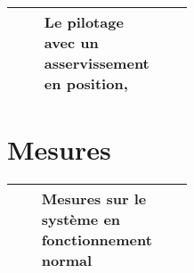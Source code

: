 \begin{tabular}{|Ep{0.4\linewidth}|p{.5\linewidth}|}
\hline
& Le pilotage avec un asservissement en position,
&\tabularnewline\hline
\end{tabular}

\section{Mesures}

\begin{tabular}{|Ep{0.4\linewidth}|p{.5\linewidth}|}
\hline
& Mesures sur le système en fonctionnement normal
&\tabularnewline\hline
\end{tabular}



